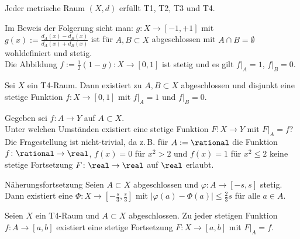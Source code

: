 \begin{Kor}
    Jeder metrische Raum $(X, d)$ erfüllt T1, T2, T3 und T4.
\end{Kor}

\begin{Bem}
    Im Beweis der Folgerung sieht man:
    $g\colon X \rightarrow [-1, +1]$ mit
    $g(x) := \frac{d_A(x) - d_B(x)}{d_A(x) + d_B(x)}$ ist für $A, B \subset X$
    abgeschlossen mit $A \cap B = \emptyset$ wohldefiniert und stetig. \\
    Die Abbildung $f := \frac{1}{2}(1 - g)\colon X \rightarrow [0, 1]$ ist
    stetig und es gilt $f|_A = 1$, $f|_B = 0$.
\end{Bem}

\begin{Satz}{}
    Sei $X$ ein T4-Raum.
    Dann existiert zu $A, B \subset X$ abgeschlossen und disjunkt eine
    stetige Funktion $f\colon X \rightarrow [0, 1]$ mit $f|_A = 1$ und
    $f|_B = 0$.
\end{Satz}

\linie

\begin{Bem}
    Gegeben sei $f\colon A \rightarrow Y$ auf $A \subset X$. \\
    Unter welchen Umständen existiert eine stetige Funktion
    $F\colon X \rightarrow Y$ mit $F|_A = f$? \\
    Die Fragestellung ist nicht-trivial, da z.\,B.
    für $A := \rational$ die Funktion $f\colon \rational \rightarrow \real$,
    $f(x) = 0$ für $x^2 > 2$ und $f(x) = 1$ für $x^2 \le 2$ keine stetige
    Fortsetzung $F\colon \real \rightarrow \real$ auf $\real$ erlaubt.
\end{Bem}

\begin{Lemma}{Näherungsfortsetzung}
    Seien $A \subset X$ abgeschlossen und $\varphi\colon A \rightarrow [-s, s]$
    stetig.
    Dann existiert eine 
    $\Phi\colon X \rightarrow \left[-\frac{s}{3}, \frac{s}{3}\right]$ mit
    $|\varphi(a) - \Phi(a)| \le \frac{2}{3}s$ für alle $a \in A$.
\end{Lemma}

\begin{Satz}{}
    Seien $X$ ein T4-Raum und $A \subset X$ abgeschlossen.
    Zu jeder stetigen Funktion $f\colon A \rightarrow [a, b]$ existiert
    eine stetige Fortsetzung $F\colon X \rightarrow [a, b]$ mit $F|_A = f$.
\end{Satz}

